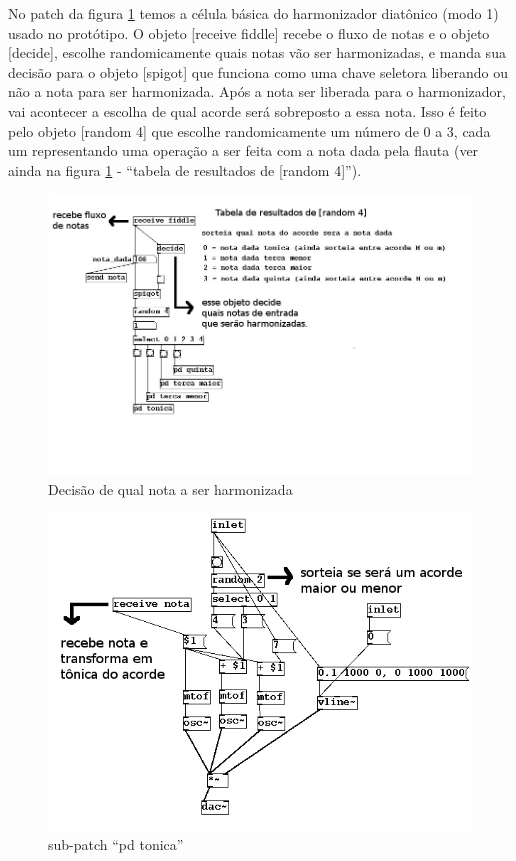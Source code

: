 \documentclass[draft]{ppgmus}
\begin{document}
No patch da figura \ref{harm1}  temos a célula básica do harmonizador diatônico (modo 1)
 usado no protótipo. 
O objeto [receive fiddle] recebe o fluxo de notas e o objeto [decide], escolhe 
randomicamente quais notas vão ser harmonizadas, e manda sua decisão para o objeto 
[spigot] que funciona como uma chave seletora liberando ou não a nota para ser harmonizada. 
Após a nota ser liberada para o harmonizador, vai acontecer  a escolha de qual acorde será 
sobreposto a essa nota. Isso é feito pelo objeto [random 4] que escolhe randomicamente um 
número de 0 a 3, cada um representando uma operação a ser feita com a nota dada pela flauta 
(ver ainda na figura \ref{harm1} - ``tabela de resultados de [random 4]'').

\begin{figure}
\includegraphics[scale=.6]{harm1}
\caption{Decisão de qual nota a ser harmonizada}
\label{harm1}
\end{figure}

\begin{figure}
\includegraphics[scale=.6]{harm2}
\caption{sub-patch ``pd tonica''}
\label{harm2}
\end{figure}
\end{document}
